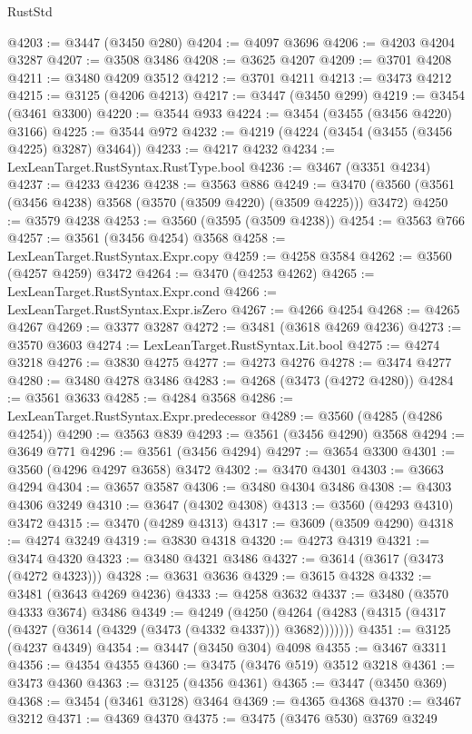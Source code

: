 \begin{lexlean}{RustStd}
\begin{coremodule}
@4203 := @3447 (@3450 @280)
@4204 := @4097 @3696
@4206 := @4203 @4204 @3287
@4207 := @3508 @3486
@4208 := @3625 @4207
@4209 := @3701 @4208
@4211 := @3480 @4209 @3512
@4212 := @3701 @4211
@4213 := @3473 @4212
@4215 := @3125 (@4206 @4213)
@4217 := @3447 (@3450 @299)
@4219 := @3454 (@3461 @3300)
@4220 := @3544 @933
@4224 := @3454 (@3455 (@3456 @4220) @3166)
@4225 := @3544 @972
@4232 := @4219 (@4224 (@3454 (@3455 (@3456 @4225) @3287) @3464))
@4233 := @4217 @4232
@4234 := LexLeanTarget.RustSyntax.RustType.bool
@4236 := @3467 (@3351 @4234)
@4237 := @4233 @4236
@4238 := @3563 @886
@4249 := @3470 (@3560 (@3561 (@3456 @4238) @3568 (@3570 (@3509 @4220) (@3509 @4225))) @3472)
@4250 := @3579 @4238
@4253 := @3560 (@3595 (@3509 @4238))
@4254 := @3563 @766
@4257 := @3561 (@3456 @4254) @3568
@4258 := LexLeanTarget.RustSyntax.Expr.copy
@4259 := @4258 @3584
@4262 := @3560 (@4257 @4259) @3472
@4264 := @3470 (@4253 @4262)
@4265 := LexLeanTarget.RustSyntax.Expr.cond
@4266 := LexLeanTarget.RustSyntax.Expr.isZero
@4267 := @4266 @4254
@4268 := @4265 @4267
@4269 := @3377 @3287
@4272 := @3481 (@3618 @4269 @4236)
@4273 := @3570 @3603
@4274 := LexLeanTarget.RustSyntax.Lit.bool
@4275 := @4274 @3218
@4276 := @3830 @4275
@4277 := @4273 @4276
@4278 := @3474 @4277
@4280 := @3480 @4278 @3486
@4283 := @4268 (@3473 (@4272 @4280))
@4284 := @3561 @3633
@4285 := @4284 @3568
@4286 := LexLeanTarget.RustSyntax.Expr.predecessor
@4289 := @3560 (@4285 (@4286 @4254))
@4290 := @3563 @839
@4293 := @3561 (@3456 @4290) @3568
@4294 := @3649 @771
@4296 := @3561 (@3456 @4294)
@4297 := @3654 @3300
@4301 := @3560 (@4296 @4297 @3658) @3472
@4302 := @3470 @4301
@4303 := @3663 @4294
@4304 := @3657 @3587
@4306 := @3480 @4304 @3486
@4308 := @4303 @4306 @3249
@4310 := @3647 (@4302 @4308)
@4313 := @3560 (@4293 @4310) @3472
@4315 := @3470 (@4289 @4313)
@4317 := @3609 (@3509 @4290)
@4318 := @4274 @3249
@4319 := @3830 @4318
@4320 := @4273 @4319
@4321 := @3474 @4320
@4323 := @3480 @4321 @3486
@4327 := @3614 (@3617 (@3473 (@4272 @4323)))
@4328 := @3631 @3636
@4329 := @3615 @4328
@4332 := @3481 (@3643 @4269 @4236)
@4333 := @4258 @3632
@4337 := @3480 (@3570 @4333 @3674) @3486
@4349 := @4249
    (@4250 (@4264 (@4283 (@4315 (@4317 (@4327 (@3614 (@4329 (@3473 (@4332 @4337))) @3682)))))))
@4351 := @3125 (@4237 @4349)
@4354 := @3447 (@3450 @304) @4098
@4355 := @3467 @3311
@4356 := @4354 @4355
@4360 := @3475 (@3476 @519) @3512 @3218
@4361 := @3473 @4360
@4363 := @3125 (@4356 @4361)
@4365 := @3447 (@3450 @369)
@4368 := @3454 (@3461 @3128) @3464
@4369 := @4365 @4368
@4370 := @3467 @3212
@4371 := @4369 @4370
@4375 := @3475 (@3476 @530) @3769 @3249

\end{coremodule}
\end{lexlean}
